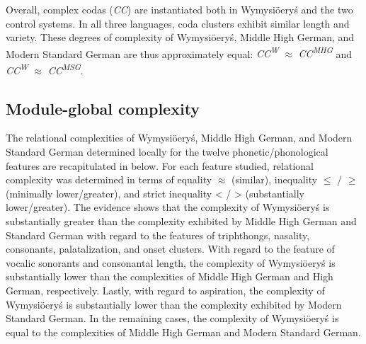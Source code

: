 \documentclass[output=paper]{langscibook}
\begin{document}
Overall, complex codas (\textit{CC}) are instantiated both in Wymysiöeryś and the two control systems. In all three languages, coda clusters exhibit similar length and variety. These degrees of complexity of Wymysiöeryś, Middle High German, and Modern Standard German are thus approximately equal: \textit{CC\textsuperscript{W}} ${\approx}$ \textit{CC\textsuperscript{MHG}} and \textit{CC\textsuperscript{W}} ${\approx}$ \textit{CC\textsuperscript{MSG}}.

\subsection{Module-global complexity}\label{sec:wymsorys:3.13}

The relational complexities of Wymysiöeryś, Middle High German, and Modern Standard German determined locally for the twelve phonetic/phonological features are recapitulated in  below. For each feature studied, relational complexity was determined in terms of equality ${\approx}$ (similar), inequality ${\leq}$ / ${\geq}$ (minimally lower/greater), and strict inequality < / > (substantially lower/greater). The evidence shows that the complexity of Wymysiöeryś is substantially greater than the complexity exhibited by Middle High German and Standard German with regard to the features of triphthongs, nasality, consonants, palatalization, and onset clusters. With regard to the feature of vocalic sonorants and consonantal length, the complexity of Wymysiöeryś is substantially lower than the complexities of Middle High German and High German, respectively. Lastly, with regard to aspiration, the complexity of Wymysiöeryś is substantially lower than the complexity exhibited by Modern Standard German. In the remaining cases, the complexity of Wymysiöeryś is equal to the complexities of Middle High German and Modern Standard German.
\end{document}
